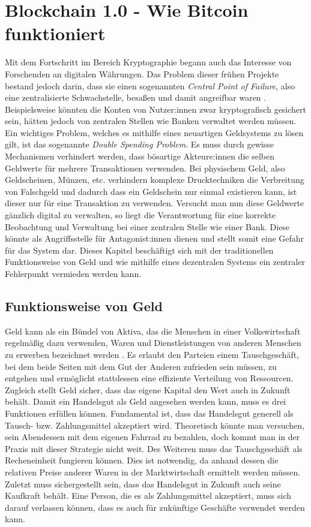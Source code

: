 \chapter{Blockchain 1.0 - Wie Bitcoin funktioniert}
Mit dem Fortschritt im Bereich Kryptographie begann auch das Interesse von Forschenden an digitalen Währungen. 
Das Problem dieser frühen Projekte bestand jedoch darin, dass sie einen sogenannten \emph{Central Point of Failure}, also eine zentralisierte Schwachstelle, besaßen und damit angreifbar waren \cite[S. 3]{antanopoulos_2014}. 
Beispielsweise könnten die Konten von Nutzer:innen zwar kryptografisch gesichert sein, hätten jedoch von zentralen Stellen wie Banken verwaltet werden müssen.
Ein wichtiges Problem, welches es mithilfe eines neuartigen Geldsystems zu lösen gilt, ist das sogenannte \emph{Double Spending Problem}. Es muss durch gewisse Mechanismen verhindert werden, dass bösartige Akteure:innen die selben Geldwerte für mehrere Transaktionen verwenden. Bei physischem Geld, also Geldscheinen, Münzen, etc. verhindern komplexe Drucktechniken die Verbreitung von Falschgeld und dadurch dass ein Geldschein nur einmal existieren kann, ist dieser nur für eine Transaktion zu verwenden.
Versucht man nun diese Geldwerte gänzlich digital zu verwalten, so liegt die Verantwortung für eine korrekte Beobachtung und Verwaltung bei einer zentralen Stelle wie einer Bank. Diese könnte als Angriffsstelle für Antagonist:innen dienen und stellt somit eine Gefahr für das System dar.
Dieses Kapitel beschäftigt sich mit der traditionellen Funktionsweise von Geld und wie mithilfe eines dezentralen Systems ein zentraler Fehlerpunkt vermieden werden kann. 
\section{Funktionsweise von Geld}
Geld kann als \glqq ein Bündel von Aktiva, das die Menschen in einer Volkswirtschaft regelmäßig dazu verwenden, Waren und Dienstleistungen von anderen Menschen zu erwerben\grqq{} bezeichnet werden \cite[S. 804]{mankiw_taylor_2018}.
Es erlaubt den Parteien einem Tauschgeschäft, bei dem beide Seiten mit dem Gut der Anderen zufrieden sein müssen, zu entgehen und ermöglicht stattdessen eine effiziente Verteilung von Ressourcen. Zugleich stellt Geld sicher, dass das eigene Kapital den Wert auch in Zukunft behält.
Damit ein Handelsgut als Geld angesehen werden kann, muss es drei Funktionen erfüllen können.
Fundamental ist, dass das Handelsgut generell als Tausch- bzw. Zahlungsmittel akzeptiert wird. Theoretisch könnte man versuchen, sein Abendessen mit dem eigenen Fahrrad zu bezahlen, doch kommt man in der Praxis mit dieser Strategie nicht weit.
Des Weiteren muss das Tauschgeschäft als Recheneinheit fungieren können. Dies ist notwendig, da anhand dessen die relativen Preise anderer Waren in der Marktwirtschaft ermittelt werden müssen.
Zuletzt muss sichergestellt sein, dass das Handelsgut in Zukunft auch seine Kaufkraft behält. Eine Person, die es als Zahlungsmittel akzeptiert, muss sich darauf verlassen können, dass es auch für zukünftige Geschäfte verwendet werden kann.\\


